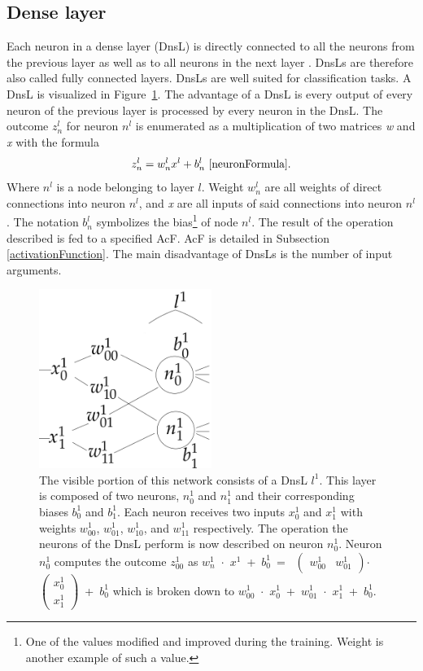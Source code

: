 \subsection{Dense layer}\label{denseLayers}
Each neuron in a dense layer (DnsL) is directly connected to all the neurons from the previous layer as well as to all neurons in the next layer \cite{CNN}. DnsLs are therefore also called fully connected layers. DnsLs are well suited for classification tasks. A DnsL is visualized in Figure~\ref{denseLayerVisualization}. The advantage of a DnsL is every output of every neuron of the previous layer is processed by every neuron in the DnsL. The outcome ${z^l_n}$ for neuron ${n^l}$  is enumerated as a multiplication of two matrices \textit{w} and \textit{x} with the formula \[{z^l_{n}}=w^l_n  x^l + b^l_n~\cite{neuronFormula}\text{.}\] Where ${n^l}$ is a node belonging to layer ${l}$. Weight ${w^l_n}$ are all weights of direct connections into neuron ${n^l}$, and \textit{x} are all inputs of said connections into neuron ${n^l}$. The notation ${b^l_n}$ symbolizes the bias\footnote{One of the values modified and improved during the training. Weight is another example of such a value.} of node ${n^l}$. The result of the operation described is fed to a specified AcF. AcF is detailed in Subsection \ref{activationFunction}. The main disadvantage of DnsLs is the number of input arguments.
\begin{figure}
  \includegraphics[width=0.5\textwidth]{Images/denseLayer.png}
  \caption[rightcaption]{The visible portion of this network consists of a DnsL ${l^1}$. This layer is composed of two neurons, ${n^1_0}$ and ${n^1_1}$ and their corresponding biases ${b^1_0}$ and ${b^1_1}$. Each neuron receives two inputs ${x^1_{0}}$ and ${x^1_{1}}$ with weights ${w^1_{00}}$, ${w^1_{01}}$, ${w^1_{10}}$, and ${w^1_{11}}$ respectively. The operation the neurons of the DnsL perform is now described on neuron ${n^1_{0}}$. Neuron ${n^1_{0}}$ computes the outcome ${z^1_{00}}$ as 
${w^1_{n}}$~$\cdot$~${x^1}$~+~${b^1_0}$~=~
 $\left(\begin{smallmatrix}{w^1_{00}}&{w^1_{01}}\end{smallmatrix}\right)$$\cdot$$\left(\begin{smallmatrix}{x^1_{0}}\\{x^1_{1}}\end{smallmatrix}\right)$~+~${b^1_0}$
which is broken down to ${w^1_{00}}$~$\cdot$~${x^1_{0}}$~+~${w^1_{01}}$~$\cdot$~${x^1_{1}}$~+~${b^1_0}$.
}
  \label{denseLayerVisualization}
\end{figure} 

